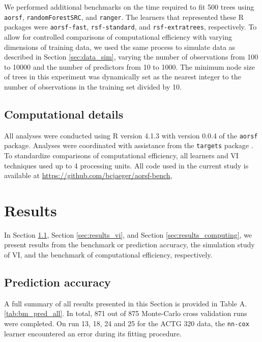 \documentclass[12pt]{article}\usepackage[]{graphicx}\usepackage[]{xcolor}
\newcommand{\secref}[1]{Section \ref{#1}}
\newcommand{\tabrefAppendix}[1]{Table A.\ref{#1}}
\begin{document}
We performed additional benchmarks on the time required to fit 500 trees using \texttt{aorsf}, \texttt{randomForestSRC}, and \texttt{ranger}. The learners that represented these R packages were \texttt{aorsf-fast}, \texttt{rsf-standard}, and \texttt{rsf-extratrees}, respectively. To allow for controlled comparisons of computational efficiency with varying dimensions of training data, we used the same process to simulate data as described in \secref{sec:data_sim}, varying the number of observations from 100 to 10000 and the number of predictors from 10 to 1000. The minimum node size of trees in this experiment was dynamically set as the nearest integer to the number of observations in the training set divided by 10.

\subsection{Computational details} \label{sec:computing}

All analyses were conducted using R version 4.1.3 with version 0.0.4 of the \texttt{aorsf} \citep{jaeger2022aorsf} package. Analyses were coordinated with assistance from the \texttt{targets} package \citep{targets}. To standardize comparisons of computational efficiency, all learners and VI techniques used up to 4 processing units. All code used in the current study is available at \href{https://github.com/bcjaeger/aorsf-bench}{https://github.com/bcjaeger/aorsf-bench},

\section{Results} \label{sec:results}

In \secref{sec:results_pred}, \secref{sec:results_vi}, and \secref{sec:results_computing}, we present results from the benchmark or prediction accuracy, the simulation study of VI, and the benchmark of computational efficiency, respectively.

\subsection{Prediction accuracy} \label{sec:results_pred}

A full summary of all results presented in this Section is provided in \tabrefAppendix{tab:bm_pred_all}. In total, 871 out of 875 Monte-Carlo cross validation runs were completed. On run 13, 18, 24 and 25 for the ACTG 320 data, the \texttt{nn-cox} learner encountered an error during its fitting procedure.
\end{document}
